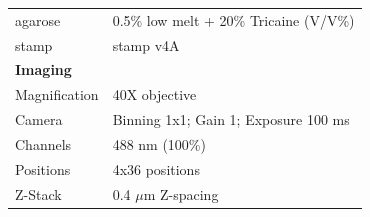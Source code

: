 \documentclass[11pt,singlespacinge,twoside]{reedthesis} %
\begin{document}
\begin{longtable}[]{@{}ll@{}}
\begin{minipage}[t]{0.21\columnwidth}
agarose\strut
\end{minipage} & \begin{minipage}[t]{0.73\columnwidth}\raggedright
0.5\% low melt + 20\% Tricaine (V/V\%)\strut
\end{minipage}\tabularnewline
\begin{minipage}[t]{0.21\columnwidth}\raggedright
stamp\strut
\end{minipage} & \begin{minipage}[t]{0.73\columnwidth}\raggedright
stamp v4A\strut
\end{minipage}\tabularnewline
\begin{minipage}[t]{0.21\columnwidth}\raggedright
\textbf{Imaging}\strut
\end{minipage} & \begin{minipage}[t]{0.73\columnwidth}\raggedright
\strut
\end{minipage}\tabularnewline
\begin{minipage}[t]{0.21\columnwidth}\raggedright
Magnification\strut
\end{minipage} & \begin{minipage}[t]{0.73\columnwidth}\raggedright
40X objective\strut
\end{minipage}\tabularnewline
\begin{minipage}[t]{0.21\columnwidth}\raggedright
Camera\strut
\end{minipage} & \begin{minipage}[t]{0.73\columnwidth}\raggedright
Binning 1x1; Gain 1; Exposure 100 ms\strut
\end{minipage}\tabularnewline
\begin{minipage}[t]{0.21\columnwidth}\raggedright
Channels\strut
\end{minipage} & \begin{minipage}[t]{0.73\columnwidth}\raggedright
488 nm (100\%)\strut
\end{minipage}\tabularnewline
\begin{minipage}[t]{0.21\columnwidth}\raggedright
Positions\strut
\end{minipage} & \begin{minipage}[t]{0.73\columnwidth}\raggedright
4x36 positions\strut
\end{minipage}\tabularnewline
\begin{minipage}[t]{0.21\columnwidth}\raggedright
Z-Stack\strut
\end{minipage} & \begin{minipage}[t]{0.73\columnwidth}\raggedright
0.4 \(\mu\)m Z-spacing\strut
\end{minipage}\tabularnewline
\bottomrule
\end{longtable}
\end{document}
